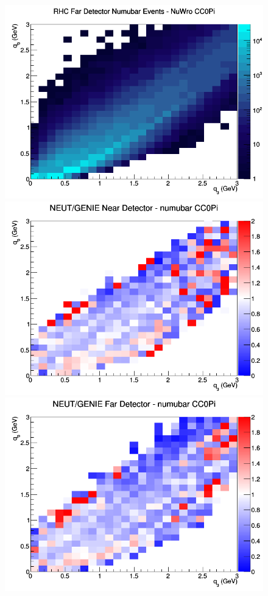 \documentclass[12pt]{article}
\begin{document}
\begin{figure}[h]
\endminipage
{}
\includegraphics[width=\linewidth]{eff_q0_q3/FGT/CC0Pi_RHC_FD_numubar_q3_q0_NuWro.png}
\endminipage
\newline
{}
\includegraphics[width=\linewidth]{eff_q0_q3/FGT/ratios/CC0Pi_NEUT_GENIE_numubar_near_q3_q0.png}
\endminipage
{}
\includegraphics[width=\linewidth]{eff_q0_q3/FGT/ratios/CC0Pi_NEUT_GENIE_numubar_far_q3_q0.png}

\end{figure}
\end{document}
